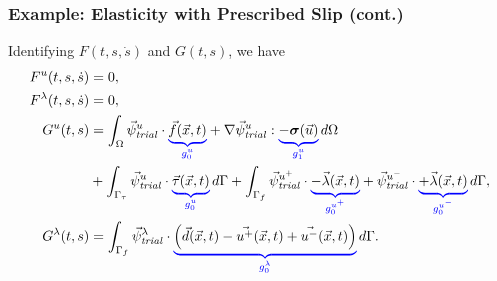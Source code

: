 \documentclass[aspectratio=169]{beamer}
\begin{document}
\begin{frame}
  \frametitle{Example: Elasticity with Prescribed Slip (cont.)}
  \summary{}

Identifying $F(t,s,\dot{s})$ and $G(t,s)$, we have
\begin{align}
  F^u(t,s,\dot{s}) &= 0, \\
  F^\lambda(t,s,\dot{s}) &= 0, \\
  G^{u}(t,s) &=  
   \int_\Omega \trialvec[u] \cdot \eqnannotate{\vec{f}(\vec{x},t)}{g_0^u}
  + \nabla \trialvec[u] :
               \eqnannotate{-\tensor{\sigma}(\vec{u})}{g_1^u} \,
               d\Omega \\
  &
  + \int_{\Gamma_\tau} \trialvec[u] \cdot \eqnannotate{\vec{\tau}(\vec{x},t)}{g_0^u} \, d\Gamma 
  + \int_{\Gamma_{f}} \trialvec[u^+] \cdot \eqnannotate{-\vec{\lambda}(\vec{x},t)}{g_0^{u^+}} + \trialvec[u^-] \cdot \eqnannotate{+\vec{\lambda}(\vec{x},t)}{g_0^{u^-}}\, d\Gamma,\\
  G^\lambda(t,s) &= 
\int_{\Gamma_{f}} \trialvec[\lambda] \cdot \eqnannotate{\left(
    \vec{d}(\vec{x},t) - \vec{u^+}(\vec{x},t) + \vec{u^-}(\vec{x},t)\right)}{g_0^\lambda} \, d\Gamma.
\end{align}

\end{frame}
\end{document}
